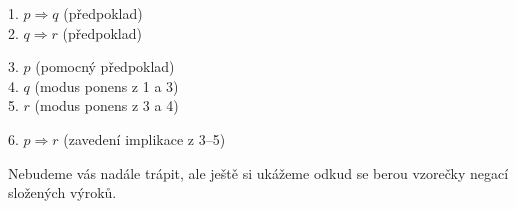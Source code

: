 
\begin{solution}
  \begin{proofbox}
    1. $p \Rightarrow q$ (předpoklad) \\
    2. $q \Rightarrow r$ (předpoklad) 
  \begin{proofbox}
    3. $p$ (pomocný předpoklad) \\
    4. $q$ (modus ponens z 1 a 3) \\
    5. $r$ (modus ponens z 3 a 4)
  \end{proofbox}
    6. $p \Rightarrow r$ (zavedení implikace z 3--5)
  \end{proofbox}
\end{solution}

Nebudeme vás nadále trápit, ale ještě si ukážeme odkud se berou vzorečky negací složených výroků.

